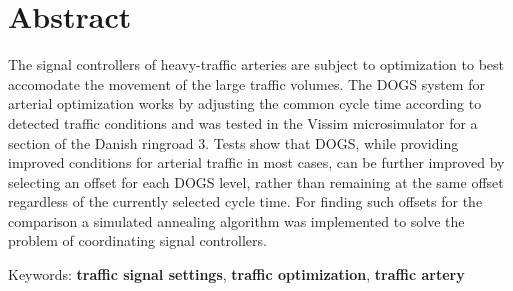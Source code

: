 \section*{Abstract}
The signal controllers of heavy-traffic arteries are subject to optimization to best accomodate the movement of the large traffic volumes.
The DOGS system for arterial optimization works by adjusting the common cycle time according to detected traffic conditions and was tested in the Vissim microsimulator for a section of the Danish ringroad 3. Tests show that DOGS, while providing improved conditions for arterial traffic in most cases, can be further improved by selecting an offset for each DOGS level, rather than remaining at the same offset regardless of the currently selected cycle time. For finding such offsets for the comparison a simulated annealing algorithm was implemented to solve the problem of coordinating signal controllers.

Keywords: \textbf{traffic signal settings}, \textbf{traffic optimization}, \textbf{traffic artery}